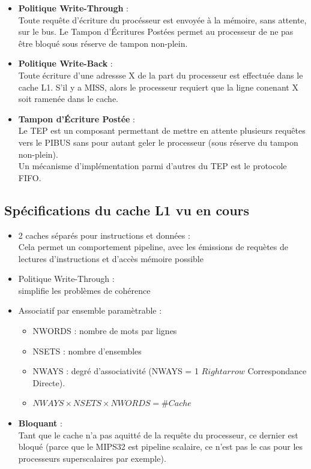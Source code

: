 \begin{itemize}
  \item {\bf Politique Write-Through} :\\
  Toute requête d'écriture du procésseur est envoyée à la mémoire, sans attente,
  sur le bus. Le Tampon d'Écritures Postées permet au processeur de ne pas être
  bloqué sous réserve de tampon non-plein.

  \item {\bf Politique Write-Back} :\\
  Toute écriture d'une adressse X de la part du processeur est effectuée dans le
  cache L1. S'il y a MISS, alors le processeur requiert que la ligne conenant X
  soit ramenée dans le cache.

  \item {\bf Tampon d'Écriture Postée} :\\
  Le TEP est un composant permettant de mettre en attente plusieurs requêtes vers
  le PIBUS sans pour autant geler le processeur (sous réserve du tampon non-plein).\\
  Un mécanisme d'implémentation parmi d'autres du TEP est le protocole FIFO.
\end{itemize}

\subsection{Spécifications du cache L1 vu en cours}
\begin{itemize}
  \item 2 caches séparés pour instructions et données :\\
  Cela permet un comportement pipeline, avec les émissions de requètes de lectures
  d'instructions et d'accès mémoire possible
  \item Politique Write-Through : \\
  simplifie les problèmes de cohérence
  \item Associatif par ensemble paramètrable :
  \begin{itemize}
    \item NWORDS : nombre de mots par lignes
    \item NSETS : nombre d'ensembles
    \item NWAYS : degré d'associativité (NWAYS = 1 $Rightarrow$ Correspondance
    Directe).
    \item ${NWAYS}\times{NSETS}\times{NWORDS}={\#Cache}$
  \end{itemize}
  \item {\bf Bloquant} :\\
  Tant que le cache n'a pas aquitté de la requête du processeur, ce dernier est
  bloqué (parce que le MIPS32 est pipeline scalaire, ce n'est pas le cas pour les
  processeurs superscalaires par exemple).
\end{itemize}

